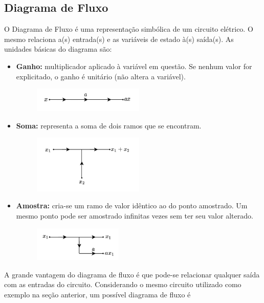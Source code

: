 \documentclass{article}
\numberwithin{equation}{section}
\begin{document}
\subsection{Diagrama de Fluxo}
\label{subsec:fluxo}
O Diagrama de Fluxo é uma representação simbólica de um circuito elétrico. O mesmo relaciona a(s) entrada(s) e as variáveis de estado à(s) saída(s). As unidades básicas do diagrama são:

\begin{itemize}
    \item \textbf{Ganho:} multiplicador aplicado à variável em questão. Se nenhum valor for explicitado, o ganho é unitário (não altera a variável).

    \begin{figure}[H]
        \centering
        \includegraphics[width=0.5\textwidth]{img/mason/ganho.png}
    \end{figure}

    \item \textbf{Soma:} representa a soma de dois ramos que se encontram.

    \begin{figure}[H]
        \centering
        \includegraphics[width=0.5\textwidth]{img/mason/soma.png}
    \end{figure}

    \item \textbf{Amostra:} cria-se um ramo de valor idêntico ao do ponto amostrado. Um mesmo ponto pode ser amostrado infinitas vezes sem ter seu valor alterado.

    \begin{figure}[H]
        \centering
        \includegraphics[width=0.4\textwidth]{img/mason/amostra.png}
    \end{figure}

\end{itemize}
A grande vantagem do diagrama de fluxo é que pode-se relacionar qualquer saída com as entradas do circuito. Considerando o mesmo circuito utilizado como exemplo na seção anterior, um possível diagrama de fluxo é
\end{document}
